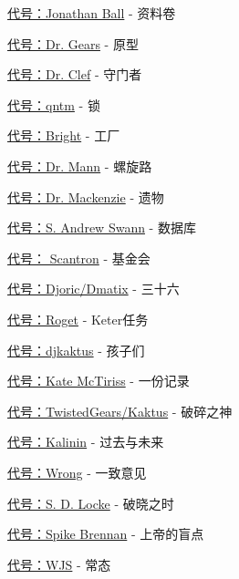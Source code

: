 
\hr

\begin{scpboxbrc}

\hyperref[chap:SCP-001.sheaf.of.papers]{代号：Jonathan Ball} - 资料卷

\hyperref[chap:SCP-001.the.prototype]{代号：Dr. Gears} - 原型

\hyperref[chap:SCP-001.the.gate.guardian]{代号：Dr. Clef} - 守门者

\hyperref[chap:SCP-001.the.lock]{代号：qntm} - 锁

\hyperref[chap:SCP-001.the.factory]{代号：Bright} - 工厂

\hyperref[chap:SCP-001.the.spiral.path]{代号：Dr. Mann} - 螺旋路

\hyperref[chap:SCP-001.the.legacy]{代号：Dr. Mackenzie} - 遗物

\hyperref[chap:SCP-001.the.database]{代号：S. Andrew Swann} - 数据库

\hyperref[chap:SCP-001.the.foundation]{代号： Scantron} - 基金会

\hyperref[chap:SCP-001.thirty.six]{代号：Djoric/Dmatix} - 三十六

\hyperref[chap:SCP-001.keter.duty]{代号：Roget} - Keter任务

\hyperref[chap:SCP-001.the.children]{代号：djkaktus} - 孩子们

\hyperref[chap:SCP-001.a.record]{代号：Kate McTiriss} - 一份记录

\hyperref[chap:SCP-001.the.broken.god]{代号：TwistedGears/Kaktus} - 破碎之神

\hyperref[chap:SCP-001.past.and.future]{代号：Kalinin} - 过去与未来

\hyperref[chap:SCP-001.the.consensus]{代号：Wrong} - 一致意见

\hyperref[chap:SCP-001.when.day.breaks]{代号：S. D. Locke} - 破晓之时

\hyperref[chap:SCP-001.gods.blind.spot]{代号：Spike Brennan} - 上帝的盲点

\hyperref[chap:SCP-001.normalcy]{代号：WJS} - 常态

\end{scpboxbrc}
